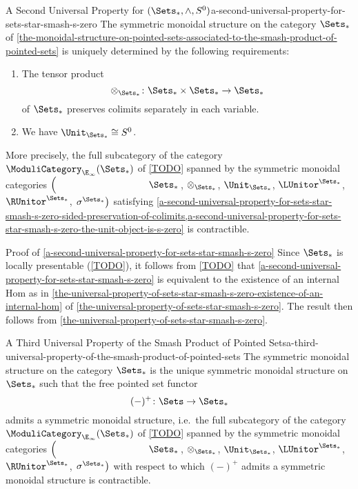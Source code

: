 \begin{corollary}{A Second Universal Property for $(\Sets_{*},\wedge,S^{0})$}{a-second-universal-property-for-sets-star-smash-s-zero}%
    The symmetric monoidal structure on the category $\Sets_{*}$ of \cref{the-monoidal-structure-on-pointed-sets-associated-to-the-smash-product-of-pointed-sets} is uniquely determined by the following requirements:
    \begin{enumerate}
        \item\label{a-second-universal-property-for-sets-star-smash-s-zero-sided-preservation-of-colimits}The tensor product
            \[
                \otimes_{\Sets_{*}}%
                \colon
                \Sets_{*}\times\Sets_{*}
                \to
                \Sets_{*}
            \]%
            of $\Sets_{*}$ preserves colimits separately in each variable.
        \item\label{a-second-universal-property-for-sets-star-smash-s-zero-the-unit-object-is-s-zero}We have $\Unit_{\Sets_{*}}\cong S^{0}$.
    \end{enumerate}
    More precisely, the full subcategory of the category $\ModuliCategory_{\E_{\infty}}(\Sets_{*})$ of \cref{TODO} spanned by the symmetric monoidal categories $\left(\phantom{\mrp{\LUnitor^{\Sets_{*}}}}\Sets_{*}\right.$, $\otimes_{\Sets_{*}}$, $\Unit_{\Sets_{*}}$, $\LUnitor^{\Sets_{*}}$, $\RUnitor^{\Sets_{*}}$, $\left.\sigma^{\Sets_{*}}\right)$ satisfying \cref{a-second-universal-property-for-sets-star-smash-s-zero-sided-preservation-of-colimits,a-second-universal-property-for-sets-star-smash-s-zero-the-unit-object-is-s-zero} is contractible.
\end{corollary}
\begin{Proof}{Proof of \cref{a-second-universal-property-for-sets-star-smash-s-zero}}%
    Since $\Sets_{*}$ is locally presentable (\cref{TODO}), it follows from \cref{TODO} that \cref{a-second-universal-property-for-sets-star-smash-s-zero} is equivalent to the existence of an internal Hom as in \cref{the-universal-property-of-sets-star-smash-s-zero-existence-of-an-internal-hom} of \cref{the-universal-property-of-sets-star-smash-s-zero}. The result then follows from \cref{the-universal-property-of-sets-star-smash-s-zero}.
\end{Proof}
\begin{corollary}{A Third Universal Property of the Smash Product of Pointed Sets}{a-third-universal-property-of-the-smash-product-of-pointed-sets}%
    The symmetric monoidal structure on the category $\Sets_{*}$ is the unique symmetric monoidal structure on $\Sets_{*}$ such that the free pointed set functor
    \[
        (-)^{+}
        \colon
        \Sets
        \to
        \Sets_{*}
    \]%
    admits a symmetric monoidal structure, i.e.\ the full subcategory of the category $\ModuliCategory_{\E_{\infty}}(\Sets_{*})$ of \cref{TODO} spanned by the symmetric monoidal categories $\left(\phantom{\mrp{\LUnitor^{\Sets_{*}}}}\Sets_{*}\right.$, $\otimes_{\Sets_{*}}$, $\Unit_{\Sets_{*}}$, $\LUnitor^{\Sets_{*}}$, $\RUnitor^{\Sets_{*}}$, $\left.\sigma^{\Sets_{*}}\right)$ with respect to which $(-)^{+}$ admits a symmetric monoidal structure is contractible.
\end{corollary}
